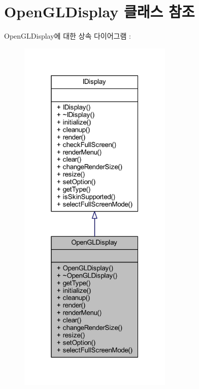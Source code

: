 \hypertarget{class_open_g_l_display}{}\section{Open\+G\+L\+Display 클래스 참조}
\label{class_open_g_l_display}


Open\+G\+L\+Display에 대한 상속 다이어그램 \+: \nopagebreak
\begin{figure}[H]
\begin{center}
\leavevmode
\includegraphics[width=208pt]{class_open_g_l_display__inherit__graph}
\end{center}
\end{figure}


